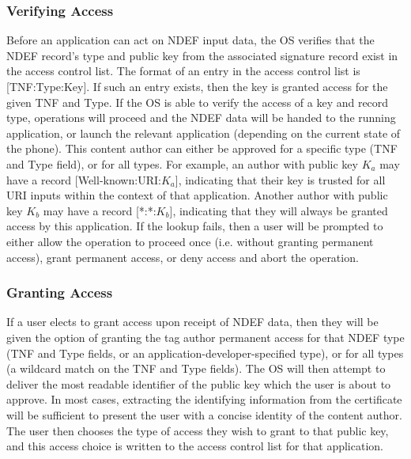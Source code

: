 \documentclass[12pt]{article}
\begin{document}
\subsubsection{Verifying Access}
Before an application can act on NDEF input data, the OS verifies that the NDEF record's type and public key from the associated signature record exist in the access control list.
The format of an entry in the access control list is [TNF:Type:Key].
If such an entry exists, then the key is granted access for the given TNF and Type.
If the OS is able to verify the access of a key and record type, operations will proceed and the NDEF data will be handed to the running application, or launch the relevant application (depending on the current state of the phone).
This content author can either be approved for a specific type (TNF and Type field), or for all types.
For example, an author with public key $K_a$ may have a record [Well-known:URI:$K_a$], indicating that their key is trusted for all URI inputs within the context of that application.
Another author with public key $K_b$ may have a record [*:*:$K_b$], indicating that they will always be granted access by this application.
If the lookup fails, then a user will be prompted to either allow the operation to proceed once (i.e. without granting permanent access), grant permanent access, or deny access and abort the operation.

\subsubsection{Granting Access}
If a user elects to grant access upon receipt of NDEF data, then they will be given the option of granting the tag author permanent access for that NDEF type (TNF and Type fields, or an application-developer-specified type), or for all types (a wildcard match on the TNF and Type fields).
The OS will then attempt to deliver the most readable identifier of the public key which the user is about to approve.
In most cases, extracting the identifying information from the certificate will be sufficient to present the user with a concise identity of the content author.
The user then chooses the type of access they wish to grant to that public key, and this access choice is written to the access control list for that application.
\end{document}
